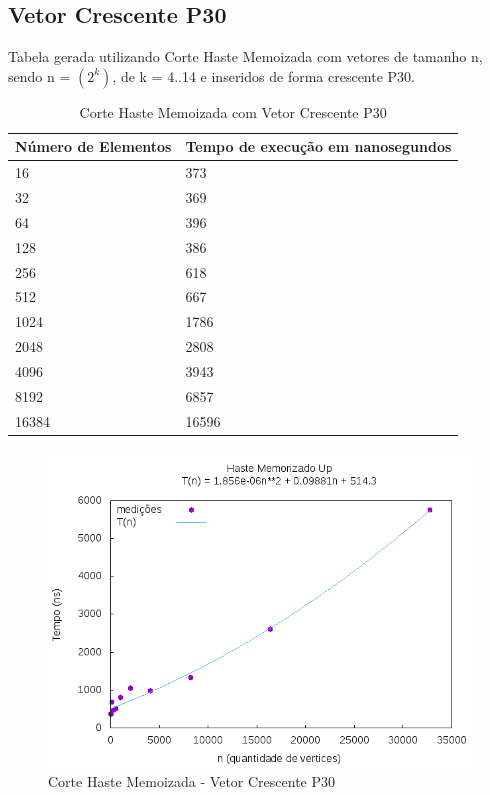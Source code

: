 \documentclass[12pt,a4paper,twoside]{report}
\begin{document}
\subsection{Vetor Crescente P30}
Tabela gerada utilizando Corte Haste Memoizada com vetores de tamanho n, sendo n = $(2^k)$, de k = 4..14 e inseridos de forma crescente P30.
\begin{table}[H]
\centering
\caption{Corte Haste Memoizada com Vetor Crescente P30}
\label{my-label}
\begin{tabular}{|l|l|}
\hline
\multicolumn{1}{|c|}{\textbf{Número de Elementos}} & \multicolumn{1}{c|}{\textbf{Tempo de execução em nanosegundos}} \\ \hline
16 & 373 \\ \hline
32 & 369 \\ \hline
64 & 396 \\ \hline
128 & 386 \\ \hline
256 & 618 \\ \hline
512 & 667 \\ \hline
1024 & 1786 \\ \hline
2048 & 2808 \\ \hline
4096 & 3943 \\ \hline
8192 & 6857 \\ \hline
16384 & 16596 \\ \hline
\end{tabular}
\end{table}

\begin{figure}[H]
    \centering
    \includegraphics[width=0.7\linewidth]{graficos/CorteHasteMemorizado/CrescenteP30/HasteMemo.png}
  \caption{Corte Haste Memoizada - Vetor Crescente P30}
\end{figure}
\end{document}
